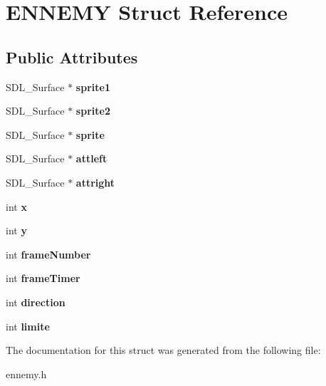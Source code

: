 \hypertarget{structENNEMY}{}\section{E\+N\+N\+E\+MY Struct Reference}
\label{structENNEMY}
\subsection*{Public Attributes}
\begin{DoxyCompactItemize}
\item 
\mbox{\label{structENNEMY_ac25da0fa30408da53cbf1d2e84496c83}} 
S\+D\+L\+\_\+\+Surface $\ast$ {\bfseries sprite1}
\item 
\mbox{\label{structENNEMY_a9bd004445368b135e9b624e54b923566}} 
S\+D\+L\+\_\+\+Surface $\ast$ {\bfseries sprite2}
\item 
\mbox{\label{structENNEMY_a3ed51f53890dfe21a5d01fec1bce4907}} 
S\+D\+L\+\_\+\+Surface $\ast$ {\bfseries sprite}
\item 
\mbox{\label{structENNEMY_aa722c3cb9003507d1e1bcf0f9a823ec6}} 
S\+D\+L\+\_\+\+Surface $\ast$ {\bfseries attleft}
\item 
\mbox{\label{structENNEMY_a3a51ea9502c0f39e76adb8b579031b86}} 
S\+D\+L\+\_\+\+Surface $\ast$ {\bfseries attright}
\item 
\mbox{\label{structENNEMY_a50b6e92184866fa1332677bd19705221}} 
int {\bfseries x}
\item 
\mbox{\label{structENNEMY_ab6da5dc254ab1fb84402d507fb6c4a6e}} 
int {\bfseries y}
\item 
\mbox{\label{structENNEMY_aedab49c42e87c5b7c5ee21a3bfd1020c}} 
int {\bfseries frame\+Number}
\item 
\mbox{\label{structENNEMY_a7e956b7a49250cc5342acecf31f8b082}} 
int {\bfseries frame\+Timer}
\item 
\mbox{\label{structENNEMY_ace3c4fa16c6b65fb8bef23bce5b417d2}} 
int {\bfseries direction}
\item 
\mbox{\label{structENNEMY_aad918d51be9082b24c69acc2b3b3ba58}} 
int {\bfseries limite}
\end{DoxyCompactItemize}


The documentation for this struct was generated from the following file\+:\begin{DoxyCompactItemize}
\item 
ennemy.\+h\end{DoxyCompactItemize}
